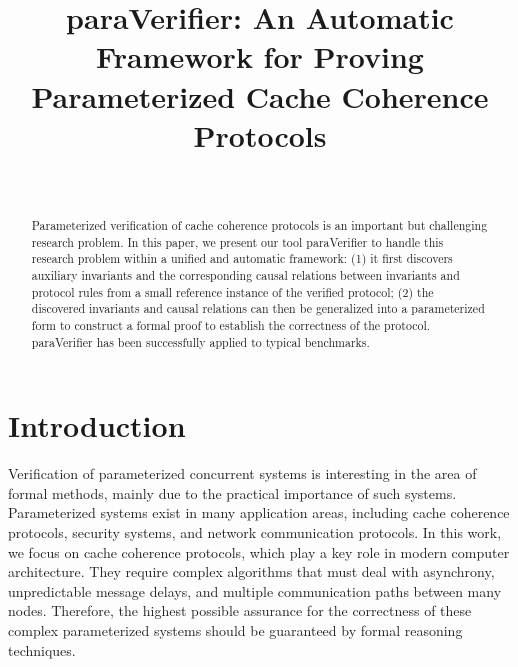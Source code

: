 \documentclass{llncs}
\begin{document}
\title{ {\sf paraVerifier}: An Automatic Framework for Proving Parameterized Cache Coherence Protocols}
\author{~}
\authorrunning{~}
\institute{~}

\maketitle

\begin{abstract}
Parameterized verification of cache coherence protocols is an important
but challenging research problem.  In this paper, we present our tool {\sf paraVerifier}
to handle this research problem within a unified and automatic framework:
(1) it first discovers auxiliary invariants and the
corresponding causal relations between invariants and protocol rules from a
small reference instance of the verified protocol; (2) the discovered
invariants and causal relations can then be generalized into a parameterized
form to construct a formal proof to establish the correctness of the protocol.
{\sf paraVerifier} has been successfully applied to typical benchmarks. 

\end{abstract}

\section{Introduction}
Verification of parameterized concurrent systems is interesting in
the area of formal methods, mainly due to the practical importance
of such systems. Parameterized systems exist in many
application areas, including cache coherence protocols, security systems, and
network communication protocols. In this work, we
focus on cache coherence protocols, which play a key role in modern
computer architecture. They require complex algorithms that must
deal with asynchrony, unpredictable message delays, and multiple
communication paths between many nodes. Therefore, the highest
possible assurance for the correctness of these complex
parameterized systems should be guaranteed by formal reasoning
techniques.
\end{document}

